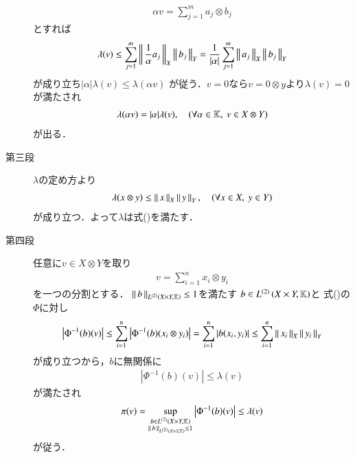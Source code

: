\begin{prf}
\begin{description}
				\begin{align}
					\alpha v = \sum_{j=1}^m a_j \otimes b_j
				\end{align}
				とすれば
				\begin{align}
					\lambda(v) \leq \sum_{j=1}^m \Norm{\frac{1}{\alpha}a_j}{X} \Norm{b_j}{Y}
					= \frac{1}{|\alpha|} \sum_{j=1}^m \Norm{a_j}{X} \Norm{b_j}{Y}
				\end{align}
				が成り立ち$|\alpha| \lambda(v) \leq \lambda(\alpha v)$
				が従う．$v=0$なら$v = 0 \otimes y$より$\lambda(v) = 0$が満たされ
				\begin{align}
					\lambda(\alpha v) = |\alpha| \lambda(v),
					\quad (\forall \alpha \in \K,\ v \in X \otimes Y)
				\end{align}
				が出る．
				
			\item[第三段]
				$\lambda$の定め方より
				\begin{align}
					\lambda(x \otimes y) \leq \Norm{x}{X} \Norm{y}{Y},
					\quad (\forall x \in X,\ y \in Y)
				\end{align}
				が成り立つ．よって$\lambda$は式()を満たす．
				
			\item[第四段]
				任意に$v \in X \otimes Y$を取り
				\begin{align}
					v = \sum_{i=1}^{n} x_i \otimes y_i
				\end{align}
				を一つの分割とする．
				$\Norm{b}{\ContLn{X \times Y}{\K}{2}} \leq 1$を満たす
				$b \in \ContLn{X \times Y}{\K}{2}$と
				式()の
				$\Phi$に対し
				\begin{align}
					\left| \Phi^{-1}(b)(v) \right|
					\leq \sum_{i=1}^{n} \left| \Phi^{-1}(b)(x_i \otimes y_i) \right|
					= \sum_{i=1}^{n} \left| b(x_i,y_i) \right|
					\leq \sum_{i=1}^{n} \Norm{x_i}{X} \Norm{y_i}{Y}
				\end{align}
				が成り立つから，$b$に無関係に
				\begin{align}
					\left| \Phi^{-1}(b)(v) \right| \leq \lambda(v)
				\end{align}
				が満たされ
				\begin{align}
					\pi(v) = \sup{\substack{b \in \ContLn{X \times Y}{\K}{2} \\ \Norm{b}{\ContLn{X \times Y}{\K}{2}} \leq 1}}{\left| \Phi^{-1}(b)(v) \right|}
					\leq \lambda(v)
				\end{align}
				が従う．
				\QED
		\end{description}
	\end{prf}